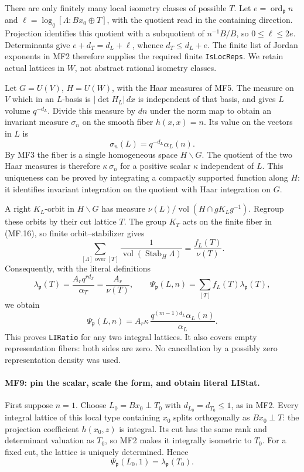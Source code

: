 There are only finitely many local isometry classes of possible
\(T\). Let \(e=\operatorname{ord}_{\mathfrak p}n\) and
\(\ell=\log_q[\Lambda:Bx_0\oplus T]\), with the quotient read
in the containing direction. Projection identifies this quotient
with a subquotient of \(n^{-1}B/B\), so \(0\le\ell\le2e\).
Determinants give \(e+d_T=d_L+\ell\), whence \(d_T\le d_L+e\).
The finite list of Jordan exponents in MF2 therefore supplies the
required finite \texttt{IsLocReps}. We retain actual lattices in
\(W\), not abstract rational isometry classes.

Let \(G=U(V)\), \(H=U(W)\), with the Haar measures of MF5.
The measure on \(V\) which in an \(L\)-basis is
\(|\det H_L|\,dx\) is independent of that basis, and gives \(L\)
volume \(q^{-d_L}\).
Divide this measure by \(dn\) under the norm map to obtain an
invariant measure \(\sigma_n\) on the smooth fiber \(h(x,x)=n\).
Its value on the vectors in \(L\) is
\[
                      \sigma_n(L)=q^{-d_L}\alpha_L(n).
\]
By MF3 the fiber is a single homogeneous space \(H\backslash G\).
The quotient of the two Haar measures is therefore
\(\kappa\,\sigma_n\) for a positive scalar \(\kappa\) independent
of \(L\). This uniqueness can be proved by integrating a compactly
supported function along \(H\): it identifies invariant integration
on the quotient with Haar integration on \(G\).

A right \(K_L\)-orbit in \(H\backslash G\) has measure
\(\nu(L)/\operatorname{vol}(H\cap gK_Lg^{-1})\).
Regroup these orbits by their cut lattice \(T\). The group \(K_T\)
acts on the finite fiber in (MF.16), so finite orbit--stabilizer
gives
\[
 \sum_{[\Lambda]\text{ over }[T]}
 \frac{1}{\operatorname{vol}(\operatorname{Stab}_H\Lambda)}
                  =\frac{f_L(T)}{\nu(T)}.
\]
Consequently, with the literal definitions
\[
 \lambda_{\mathfrak p}(T)=\frac{A_rq^{r d_T}}{\alpha_T}
                         =\frac{A_r}{\nu(T)},\qquad
 \Psi_{\mathfrak p}(L,n)=\sum_{[T]}f_L(T)\lambda_{\mathfrak p}(T),
\]
we obtain
\[
 \Psi_{\mathfrak p}(L,n)
   =A_r\kappa\,\frac{q^{(m-1)d_L}\alpha_L(n)}{\alpha_L}.
                                                               \tag{MF.17}
\]
This proves \texttt{LIRatio} for any two integral lattices.
It also covers empty representation fibers: both sides are zero.
No cancellation by a possibly zero representation density was used.

\paragraph{MF9: pin the scalar, scale the form, and obtain literal LIStat.}
First suppose \(n=1\). Choose \(L_0=Bx_0\perp T_0\) with
\(d_{L_0}=d_{T_0}\le1\), as in MF2.
Every integral lattice of this local type containing \(x_0\)
splits orthogonally as \(Bx_0\perp T\): the projection coefficient
\(h(x_0,z)\) is integral. Its cut has the same rank and determinant
valuation as \(T_0\), so MF2 makes it integrally isometric to \(T_0\).
For a fixed cut, the lattice is uniquely determined. Hence
\[
                       \Psi_{\mathfrak p}(L_0,1)
                              =\lambda_{\mathfrak p}(T_0).       \tag{MF.18}
\]

